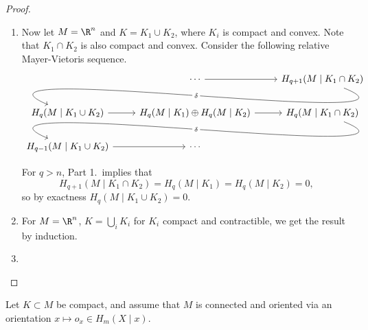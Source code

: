 \documentclass[main.tex]{subfiles}
\begin{document}
\begin{proof}
\begin{enumerate}
    \item Now let \(M = \R^{n}\) and \(K = K_{1} \cup K_{2}\), where \(K_{i}\) is compact and convex. Note that \(K_{1} \cap K_{2}\) is also compact and convex. Consider the following relative Mayer-Vietoris sequence.
      \begin{equation*}
        \begin{tikzcd}
          & \cdots
          \arrow[r]
          & H_{q+1}(M\mid K_{1} \cap K_{2})
          \\
          H_{q}(M\mid K_{1} \cup K_{2})
          \arrow[from=urr, out=-22, in=157, looseness=1, overlay, "\delta" description]
          \arrow[r]
          & H_{q}(M\mid K_{1}) \oplus H_{q}(M\mid K_{2})
          \arrow[r]
          & H_{q}(M\mid K_{1} \cap K_{2})
          \\
          H_{q-1}(M\mid K_{1} \cup K_{2})
          \arrow[r]
          \arrow[from=urr, out=-22, in=157, looseness=1, overlay, "\delta" description]
          & \cdots
        \end{tikzcd}
      \end{equation*}

      For \(q > n\), Part 1.\ implies that
      \begin{equation*}
        H_{q+1}(M\mid K_{1} \cap K_{2}) = H_{q}(M \mid K_{1}) = H_{q}(M \mid K_{2}) = 0,
      \end{equation*}
      so by exactness \(H_{q}(M \mid K_{1} \cup K_{2}) = 0\).

    \item For \(M = \R^{n}\), \(K = \bigcup_{i} K_{i}\) for \(K_{i}\) compact and contractible, we get the result by induction.

    \item
  \end{enumerate}
\end{proof}

\begin{proposition}
  Let \(K \subset M\) be compact, and assume that \(M\) is connected and oriented via an orientation \(x \mapsto o_{x} \in H_{m}(X \mid x)\).
\end{proposition}
\end{document}

